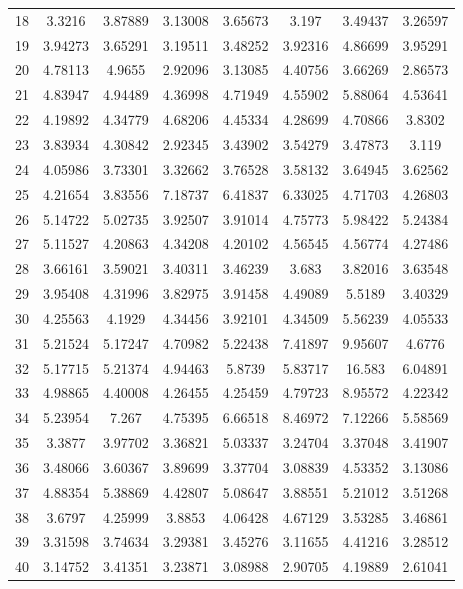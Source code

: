 \begin{center}
\begin{longtable}{cccccccc}
18 & 3.3216 & 3.87889 & 3.13008 & 3.65673 & 3.197 & 3.49437 & 3.26597\\
19 & 3.94273 & 3.65291 & 3.19511 & 3.48252 & 3.92316 & 4.86699 & 3.95291\\
20 & 4.78113 & 4.9655 & 2.92096 & 3.13085 & 4.40756 & 3.66269 & 2.86573\\
21 & 4.83947 & 4.94489 & 4.36998 & 4.71949 & 4.55902 & 5.88064 & 4.53641\\
22 & 4.19892 & 4.34779 & 4.68206 & 4.45334 & 4.28699 & 4.70866 & 3.8302\\
23 & 3.83934 & 4.30842 & 2.92345 & 3.43902 & 3.54279 & 3.47873 & 3.119\\
24 & 4.05986 & 3.73301 & 3.32662 & 3.76528 & 3.58132 & 3.64945 & 3.62562\\
25 & 4.21654 & 3.83556 & 7.18737 & 6.41837 & 6.33025 & 4.71703 & 4.26803\\
26 & 5.14722 & 5.02735 & 3.92507 & 3.91014 & 4.75773 & 5.98422 & 5.24384\\
27 & 5.11527 & 4.20863 & 4.34208 & 4.20102 & 4.56545 & 4.56774 & 4.27486\\
28 & 3.66161 & 3.59021 & 3.40311 & 3.46239 & 3.683 & 3.82016 & 3.63548\\
29 & 3.95408 & 4.31996 & 3.82975 & 3.91458 & 4.49089 & 5.5189 & 3.40329\\
30 & 4.25563 & 4.1929 & 4.34456 & 3.92101 & 4.34509 & 5.56239 & 4.05533\\
31 & 5.21524 & 5.17247 & 4.70982 & 5.22438 & 7.41897 & 9.95607 & 4.6776\\
32 & 5.17715 & 5.21374 & 4.94463 & 5.8739 & 5.83717 & 16.583 & 6.04891\\
33 & 4.98865 & 4.40008 & 4.26455 & 4.25459 & 4.79723 & 8.95572 & 4.22342\\
34 & 5.23954 & 7.267 & 4.75395 & 6.66518 & 8.46972 & 7.12266 & 5.58569\\
35 & 3.3877 & 3.97702 & 3.36821 & 5.03337 & 3.24704 & 3.37048 & 3.41907\\
36 & 3.48066 & 3.60367 & 3.89699 & 3.37704 & 3.08839 & 4.53352 & 3.13086\\
37 & 4.88354 & 5.38869 & 4.42807 & 5.08647 & 3.88551 & 5.21012 & 3.51268\\
38 & 3.6797 & 4.25999 & 3.8853 & 4.06428 & 4.67129 & 3.53285 & 3.46861\\
39 & 3.31598 & 3.74634 & 3.29381 & 3.45276 & 3.11655 & 4.41216 & 3.28512\\
40 & 3.14752 & 3.41351 & 3.23871 & 3.08988 & 2.90705 & 4.19889 & 2.61041\\

\end{longtable}
\end{center}
